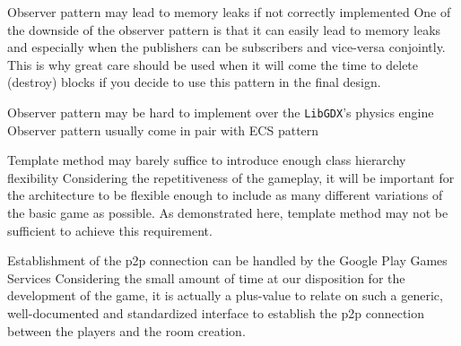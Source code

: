 \begin{description}[style=nextline]
  \item[R3\label{r3}] Observer pattern may lead to memory leaks if not correctly implemented
    \vspace{\baselineskip}
    \newline
    One of the downside of the observer pattern is that it can easily lead to memory leaks and especially when the publishers can be subscribers and vice-versa conjointly. This is why great care should be used when it will come the time to delete (destroy) blocks if you decide to use this pattern in the final design. \cite{wiki:observer}
    
  \item[R4\label{r4}] Observer pattern may be hard to implement over the \texttt{LibGDX}'s physics engine
    \vspace{\baselineskip}
    \newline
    Observer pattern usually come in pair with ECS pattern

  \item[R5\label{r5}] Template method may barely suffice to introduce enough class hierarchy flexibility
    \vspace{\baselineskip}
    \newline
    Considering the repetitiveness of the gameplay, it will be important for the architecture to be flexible enough to include as many different variations of the basic game as possible. As demonstrated here, template method may not be sufficient to achieve this requirement.

\end{description}

\begin{description}[style=nextline]
  \item[N1\label{n1}] Establishment of the \gls{p2p} connection can be handled by the Google Play Games Services
  \vspace{\baselineskip}
  \newline
  Considering the small amount of time at our disposition for the development of the game, it is actually a plus-value to relate on such a generic, well-documented and standardized interface to establish the \gls{p2p} connection between the players and the room creation.

\end{description}
